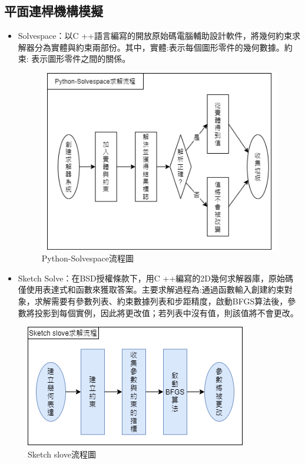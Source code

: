 \documentclass[14pt,a4paper]{report}  %
\begin{document}
    	
      \subsection{平面連桿機構模擬}
      \begin{itemize} 
      \item Solvespace：以C ++語言編寫的開放原始碼電腦輔助設計軟件，將幾何約束求解器分為實體與約束兩部份。其中，實體:表示每個圖形零件的幾何數據。約束: 表示圖形零件之間的關係。

		\begin{figure}[H]
        \centering
        \includegraphics[scale=0.6]{Python-Solvespace求解流程.png} 
        \caption{Python-Solvespace流程圖} 
        \label{fig:scale}
    	\end{figure}
    	
      \item Sketch Solve：在BSD授權條款下，用C ++編寫的2D幾何求解器庫，原始碼僅使用表達式和函數來獲取答案。主要求解過程為:通過函數輸入創建約束對象，求解需要有參數列表、約束數據列表和步距精度，啟動BFGS算法後，參數將投影到每個實例，因此將更改值；若列表中沒有值，則該值將不會更改。
      	\end{itemize} 
      	
		\begin{figure}[H]
        \centering
        \includegraphics[scale=0.7]{Sketch slove.png} 
        \caption{Sketch slove流程圖} 
        \label{fig:scale}
    	\end{figure}
    	
\end{document}
